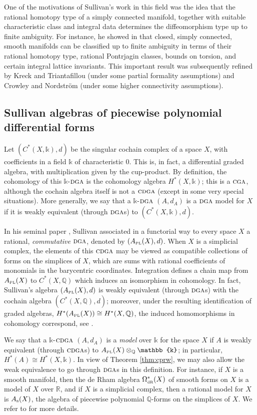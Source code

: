 \documentclass{article}
\numberwithin{equation}{section}
\theoremstyle{definition}
\newcommand{\Q}{\mathbb{Q}}
\newcommand{\R}{\mathbb{R}}
\renewcommand{\k}{\mathbb{k}}
\newcommand{\dga}{\ensuremath{\textsc{dga}}}
\newcommand{\cga}{\ensuremath{\textsc{cga}}}
\newcommand{\cdga}{\ensuremath{\textsc{cdga}}}
\newcommand{\dR}{\scriptscriptstyle{\rm dR}}
\newcommand{\apl}{A_{\scriptscriptstyle{{\rm PL}}}}
\begin{document}
One of the motivations of Sullivan’s work in this field was  
the idea that the rational homotopy type of a simply connected 
manifold, together with suitable characteristic class and integral data 
determines the diffeomorphism type up to finite ambiguity. For instance, 
he showed in \cite[Theorem 13.1]{Sullivan77} that closed, simply connected, 
smooth manifolds can be classified up to finite ambiguity in terms of 
their rational homotopy type, rational Pontrjagin classes, bounds on torsion, 
and certain integral lattice invariants. This important result was 
subsequently refined by Kreck and Triantafillou \cite{KT} (under 
some partial formality assumptions) and Crowley and Nordstr\"{o}m \cite{CN} 
(under some higher connectivity assumptions). 

\subsection{Sullivan algebras of piecewise polynomial differential forms}
\label{subsec:algmodels}
Let $(C^{*}(X,\k),d)$ be the singular cochain complex of a space $X$, 
with coefficients in a field $\k$ of characteristic $0$. This is, in fact, 
a differential graded algebra, with multiplication given by the cup-product. 
By definition, the cohomology of this $\k$-$\dga$ is the cohomology algebra 
$H^*(X,\k)$; this is a $\cga$, although the cochain algebra itself is not a 
$\cdga$ (except in some very special situations).  More generally, we say 
that a $\k$-$\dga$ $(A,d_A)$ is a $\dga$ model for $X$ if it is weakly equivalent 
(through $\dga$s) to $(C^{*}(X,\k),d)$. 

In his seminal paper \cite{Sullivan77},  Sullivan associated in 
a functorial way to every space $X$ a rational, {\em commutative}\/ 
$\dga$, denoted by $(\apl(X),d)$. When $X$ is a simplicial complex, 
the elements of this $\cdga$ may be viewed as compatible collections 
of forms on the simplices of $X$, which are sums with rational coefficients 
of monomials in the barycentric coordinates.  
Integration defines a chain map from $\apl(X)$ to $C^*(X,\Q)$ which 
induces an isomorphism in cohomology. In fact, Sullivan's algebra 
$(\apl(X),d)$ is weakly equivalent (through $\dga$s) with the cochain 
algebra $(C^*(X,\Q),d)$; moreover, under the resulting identification 
of graded algebras, $H^{*}(\apl(X)) \cong H^{*}(X,\Q)$, the induced 
homomorphisms in cohomology correspond, see \cite[Corollary 10.10]{FHT}. 
  
We say that a $\k$-$\cdga$ $(A,d_A)$ is a {\em model}\/
over $\k$ for the space $X$ if $A$ is weakly equivalent (through $\cdga$s) 
to $\apl(X)\otimes_{\Q} \k$; in particular, $H^*(A)\cong H^*(X,\k)$. 
In view of Theorem \ref{thm:cprw}, 
we may also allow the weak equivalence to go through $\dga$s 
in this definition. For instance, if $X$ is a smooth manifold, then 
the de Rham algebra $\Omega^{*}_{\dR}(X)$ of smooth forms on 
$X$ is a model of $X$ over $\R$, and if $X$ is a simplicial 
complex, then a rational model for $X$ is $A_{{\rm s}}(X)$, the 
algebra of piecewise polynomial $\Q$-forms on the simplices of $X$. 
We refer to \cite{FHT, FHT2, FOT, Tanre} for more details.
\end{document}
